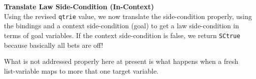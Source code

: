 \textbf{Translate Law Side-Condition (In-Context)}\\ %
Using the revised \texttt{qtrie} value,
we now translate the side-condition properly,
using the bindings and a context side-condition (goal)
to get a law side-condition in terms of goal variables.
If the context side-condition is false,
we return \texttt{SCtrue} because basically all bets are off!

What is not addressed properly here at present is what happens
when a fresh list-variable maps to more that one target variable.
